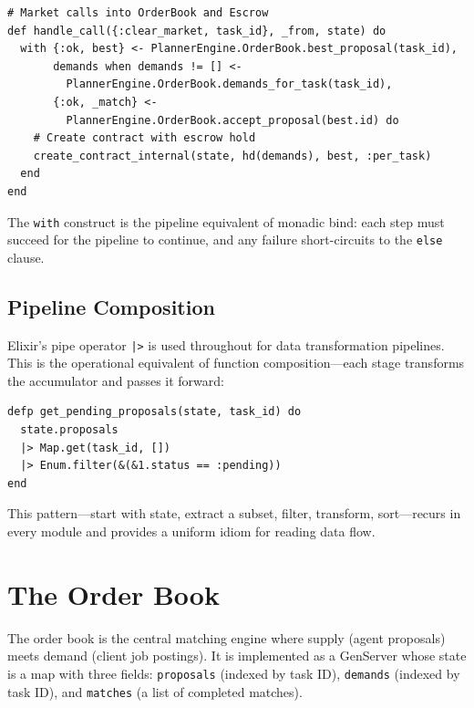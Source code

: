 \documentclass[12pt,a4paper]{article}
\theoremstyle{plain}
\theoremstyle{definition}
\begin{document}
\begin{lstlisting}[caption={Message passing between modules},label={lst:message-passing}]
# Market calls into OrderBook and Escrow
def handle_call({:clear_market, task_id}, _from, state) do
  with {:ok, best} <- PlannerEngine.OrderBook.best_proposal(task_id),
       demands when demands != [] <-
         PlannerEngine.OrderBook.demands_for_task(task_id),
       {:ok, _match} <-
         PlannerEngine.OrderBook.accept_proposal(best.id) do
    # Create contract with escrow hold
    create_contract_internal(state, hd(demands), best, :per_task)
  end
end
\end{lstlisting}

The \texttt{with} construct is the pipeline equivalent of monadic bind: each step must succeed for the pipeline to continue, and any failure short-circuits to the \texttt{else} clause.

\subsection{Pipeline Composition}

Elixir's pipe operator \texttt{|>} is used throughout for data transformation pipelines. This is the operational equivalent of function composition---each stage transforms the accumulator and passes it forward:

\begin{lstlisting}[caption={Pipeline composition in the OrderBook},label={lst:pipeline}]
defp get_pending_proposals(state, task_id) do
  state.proposals
  |> Map.get(task_id, [])
  |> Enum.filter(&(&1.status == :pending))
end
\end{lstlisting}

This pattern---start with state, extract a subset, filter, transform, sort---recurs in every module and provides a uniform idiom for reading data flow.

\section{The Order Book}\label{sec:order-book}

The order book is the central matching engine where supply (agent proposals) meets demand (client job postings). It is implemented as a GenServer whose state is a map with three fields: \texttt{proposals} (indexed by task ID), \texttt{demands} (indexed by task ID), and \texttt{matches} (a list of completed matches).
\end{document}
